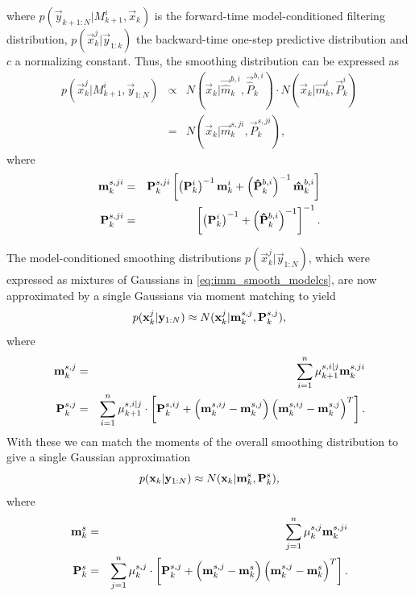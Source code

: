 % 
where $p(\vec{y}_{k+1:N}|M_{k+1}^i,\vec{x}_k)$ is the forward-time
model-conditioned filtering distribution,
$p(\vec{x}_k^j|\vec{y}_{1:k})$ the backward-time one-step predictive
distribution and $c$ a normalizing constant. Thus, the smoothing
distribution can be expressed as
%
\begin{eqnarray}
%
p(\vec{x}_k^j|M_{k+1}^i,\vec{y}_{1:N}) & \propto&
N(\vec{x}_k|\vec{\hat{m}}_k^{b,i},\vec{\hat{P}}_k^{b,i}) \cdot
N(\vec{x}_k|\vec{m}_k^{i},\vec{P}_k^{i}) \\ & = &
N(\vec{x}_k|\vec{m}_k^{s,ji},\vec{P}_k^{s,ji}),
%
\end{eqnarray}
%
where
% 
\begin{eqnarray}
%  
\vec{m}_k^{s,ji} & = & \mat{P}_k^{s,ji} \left[
\left(\vec{P}_k^{i}\right)^{-1}\vec{m}_k^{i} +
\left(\vec{\hat{P}}_k^{b,i}\right)^{-1}\vec{\hat{m}}_k^{b,i} \right]
\\
%
\mat{P}_k^{s,ji} & = & \left[ \left(\vec{P}_k^{i}\right)^{-1} +
\left(\vec{\hat{P}}_k^{b,i}\right)^{-1} \right]^{-1}.
%
\end{eqnarray}
%

The model-conditioned smoothing distributions
$p(\vec{x}_k^j|\vec{y}_{1:N})$, which were expressed as mixtures of
Gaussians in \eqref{eq:imm_smooth_modelcs}, are now approximated by a
single Gaussians via moment matching to yield
%
\begin{equation}
%
p(\vec{x}_k^j|\vec{y}_{1:N}) \approx
N(\vec{x}_k^j|\vec{m}_k^{s,j},\mat{P}_k^{s,j}),
%
\end{equation}
%
where
%
\begin{eqnarray}
%
\vec{m}_k^{s,j} & = & \sum_{i=1}^{n} \mu_{k+1}^{s,i|j}
\vec{m}_k^{s,ji} \\
%
\mat{P}_k^{s,j} & = & \sum_{i=1}^n \mu_{k+1}^{s,i|j} \cdot \left[
\mat{P}_{k}^{s,ij} + \left( \vec{m}_{k}^{s,ij} - \vec{m}_{k}^{s,j}
\right) \left( \vec{m}_{k}^{s,ij} - \vec{m}_{k}^{s,j}
\right)^T\right].
%
\end{eqnarray}
%
With these we can match the moments of the overall smoothing
distribution to give a single Gaussian approximation
%
\begin{equation}
%
p(\vec{x}_k|\vec{y}_{1:N}) \approx
N(\vec{x}_k|\vec{m}_k^s,\mat{P}_k^s),
%
\end{equation}
%
where
%
\begin{eqnarray}
%
\vec{m}_k^s & = & \sum_{j=1}^{n} \mu_{k}^{s,j} \vec{m}_k^{s,ji} \\
%
\mat{P}_k^{s} & = & \sum_{j=1}^n \mu_{k}^{s,j} \cdot \left[
\mat{P}_{k}^{s,j} + \left( \vec{m}_{k}^{s,j} - \vec{m}_k^s \right)
\left( \vec{m}_{k}^{s,j} - \vec{m}_k^s \right)^T\right].
%
\end{eqnarray}
%

